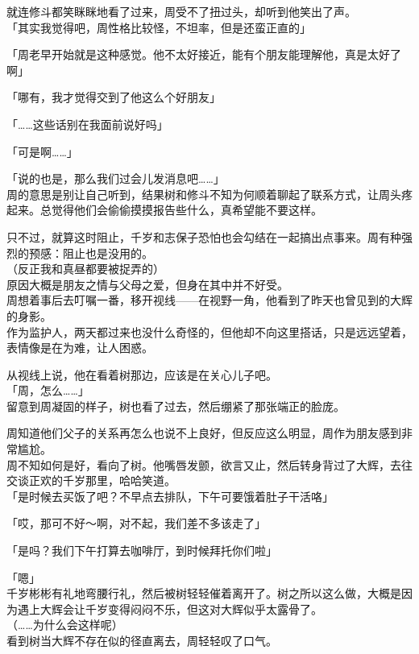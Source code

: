 就连修斗都笑眯眯地看了过来，周受不了扭过头，却听到他笑出了声。\\

「其实我觉得吧，周性格比较怪，不坦率，但是还蛮正直的」

「周老早开始就是这种感觉。他不太好接近，能有个朋友能理解他，真是太好了啊」

「哪有，我才觉得交到了他这么个好朋友」

「……这些话别在我面前说好吗」

「可是啊……」

「说的也是，那么我们过会儿发消息吧……」\\

周的意思是别让自己听到，结果树和修斗不知为何顺着聊起了联系方式，让周头疼起来。总觉得他们会偷偷摸摸报告些什么，真希望能不要这样。

只不过，就算这时阻止，千岁和志保子恐怕也会勾结在一起搞出点事来。周有种强烈的预感：阻止也是没用的。\\

（反正我和真昼都要被捉弄的）\\

原因大概是朋友之情与父母之爱，但身在其中并不好受。\\

周想着事后去叮嘱一番，移开视线——在视野一角，他看到了昨天也曾见到的大辉的身影。\\

作为监护人，两天都过来也没什么奇怪的，但他却不向这里搭话，只是远远望着，表情像是在为难，让人困惑。

从视线上说，他在看着树那边，应该是在关心儿子吧。\\

「周，怎么……」\\

留意到周凝固的样子，树也看了过去，然后绷紧了那张端正的脸庞。

周知道他们父子的关系再怎么也说不上良好，但反应这么明显，周作为朋友感到非常尴尬。\\

周不知如何是好，看向了树。他嘴唇发颤，欲言又止，然后转身背过了大辉，去往交谈正欢的千岁那里，哈哈笑道。\\

「是时候去买饭了吧？不早点去排队，下午可要饿着肚子干活咯」

「哎，那可不好～啊，对不起，我们差不多该走了」

「是吗？我们下午打算去咖啡厅，到时候拜托你们啦」

「嗯」\\

千岁彬彬有礼地弯腰行礼，然后被树轻轻催着离开了。树之所以这么做，大概是因为遇上大辉会让千岁变得闷闷不乐，但这对大辉似乎太露骨了。\\

（……为什么会这样呢）\\

看到树当大辉不存在似的径直离去，周轻轻叹了口气。
